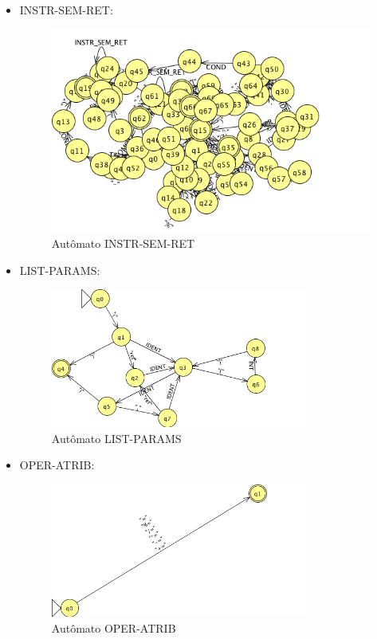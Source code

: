 \begin{itemize}
	\item INSTR-SEM-RET:
	\begin{figure}[H]
		\centering 
		\includegraphics[width=1.0\textwidth]{images/submaquinas/INSTR-SEM-RET.png}  
		\caption{Autômato INSTR-SEM-RET}
	\end{figure}
	
	\item LIST-PARAMS:
	\begin{figure}[H]
		\centering 
		\includegraphics[width=0.8\textwidth]{images/submaquinas/LIST-PARAMS.png}  
		\caption{Autômato LIST-PARAMS}
	\end{figure}
	
	\item OPER-ATRIB:
	\begin{figure}[H]
		\centering 
		\includegraphics[width=0.8\textwidth]{images/submaquinas/OPER-ATRIB.png}  
		\caption{Autômato OPER-ATRIB}
	\end{figure}
	

\end{itemize}
